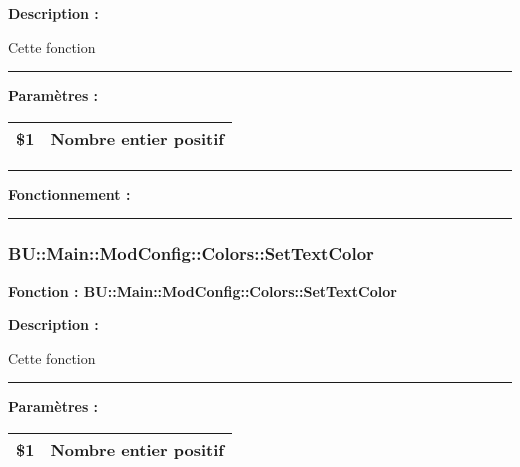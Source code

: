 \documentclass[a4paper,10pt]{article}
\begin{document}
\begin{justify}
    \textbf{Description :}

    Cette fonction
\end{justify}


\par\noindent\rule{\textwidth}{0.4pt}

\begin{justify}
    \textbf{Paramètres :}

    \begin{tabular}{|l|l|}
        \hline
        \textbf{\color{orange}\$1} & Nombre entier positif\\
        \hline
    \end{tabular}
\end{justify}


\par\noindent\rule{\textwidth}{0.4pt}

\begin{justify}
    \textbf{Fonctionnement :}

    
\end{justify}






\color{sec3}\par\noindent\rule{\textwidth}{0.4pt}\color{text}

\color{sec3}
\subsubsection{BU::Main::ModConfig::Colors::SetTextColor}\color{text}

\begin{justify}
    \textbf{Fonction : \color{func}BU::Main::ModConfig::Colors::SetTextColor}
\end{justify}

\begin{justify}
    \textbf{Description :}

    Cette fonction
\end{justify}


\par\noindent\rule{\textwidth}{0.4pt}

\begin{justify}
    \textbf{Paramètres :}

    \begin{tabular}{|l|l|}
        \hline
        \textbf{\color{orange}\$1} & Nombre entier positif\\
        \hline
    \end{tabular}
\end{justify}
\end{document}
